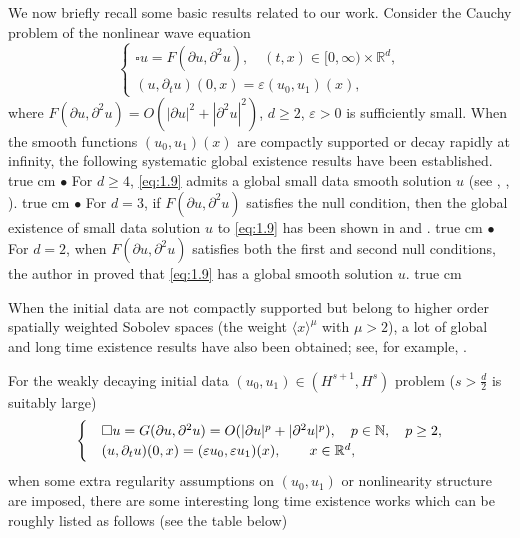 \documentclass[11pt,twoside]{article}
\def\f{\frac}
\newcommand{\w}[1]{\langle {#1} \rangle}
\theoremstyle{plain}
\theoremstyle{definition}
\theoremstyle{assumption}
\numberwithin{equation}{section}
\begin{document}
	We now briefly recall some basic results related to our work.
	Consider the Cauchy problem of the nonlinear wave equation
	\begin{equation}\label{eq:1.9}
		\begin{cases}
			\square u = F(\partial u,\partial^2 u), \quad (t,x) \in [0,\infty)\times\mathbb{R}^d,\\
			(u,\partial_t u)(0,x)=\varepsilon (u_0, u_1)(x),
		\end{cases}
	\end{equation}
	where $F(\partial u,\partial^2 u)=O(|\partial u|^2+|\partial^2 u|^2)$, $d\geq 2$, $\varepsilon>0$ is sufficiently small.
	When the smooth functions $(u_0,u_1)(x)$ are compactly supported or decay rapidly at infinity, the following systematic
global existence results have been established.
	 true cm
	{\bf $\bullet$} For $d \geq 4$,  \eqref{eq:1.9}
	admits a global small data smooth solution $u$ (see \cite{Hormander}, \cite{KlainermanPonce}, \cite{LiChen}).
	 true cm
	{\bf $\bullet$} For $d = 3$, if  $F(\partial u,\partial^2 u)$ satisfies the null condition,
	then the global existence of small data solution $u$ to \eqref{eq:1.9} has been shown in \cite{Christodoulou} and \cite{Klainerman2}.
	 true cm
	{\bf $\bullet$} For $d=2$, when $F(\partial u,\partial^2 u)$ satisfies both the first and second null conditions, the author in \cite{Alinhac1} proved that \eqref{eq:1.9} has a global smooth solution $u$.
	 true cm
	
	When the initial data are not compactly supported but belong to
	higher order spatially weighted Sobolev spaces (the weight $\w{x}^\mu$ with $\mu> 2$), a lot of global and long time
	existence results have also been obtained; see, for example,
	\cite{Asa,CaiLei,HouYin1}.
	

	
	
	
	
For the weakly decaying initial data $(u_0, u_1)\in (H^{s+1}, H^{s})$ problem ($s>\f{d}{2}$ is suitably large)
\begin{equation}\label{YHC-9A}
\begin{cases}
&\square u
=G(\partial u,\partial^2 u)=O(|\partial u|^p+|\partial^2 u|^p),\quad p\in\Bbb N,\quad p\ge 2,\\
&(u,\partial_t u)(0,x) = (\varepsilon u_0,\varepsilon u_1)(x),\qquad x\in \Bbb R^d,
\end{cases}
\end{equation}
when some extra regularity assumptions on $(u_0, u_1)$ or nonlinearity structure are imposed, there are some interesting
long time existence works which can be roughly listed  as follows (see the table below)	
\end{document}
